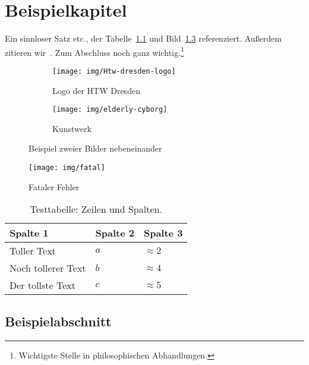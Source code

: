 
\chapter{Beispielkapitel}


Ein sinnloser Satz \gls{etc.}, der Tabelle~\ref{tab:testtable} und Bild~\ref{fig:testfig} referenziert.
Außerdem zitieren wir~\textcite{test16}.
Zum Abschluss noch ganz wichtig.\footnote{Wichtigste Stelle in philosophischen Abhandlungen.}


\begin{figure}[p]
    \centering
    \begin{subfigure}[b]{0.48\linewidth}
        \centering
        \texttt{[image: img/Htw-dresden-logo]}
        \caption{Logo der HTW Dresden}\label{fig:logo-htw}
    \end{subfigure}\enspace%
    \begin{subfigure}[b]{0.48\linewidth}
        \centering
        \texttt{[image: img/elderly-cyborg]}
        \caption{Kunstwerk}\label{fig:kunstwerk}
    \end{subfigure}
    \caption{Beispiel zweier Bilder nebeneinander}\label{fig:testfig}
\end{figure}

\begin{figure}[p]
    \centering
    \texttt{[image: img/fatal]}
    \caption{Fataler Fehler}\label{fig:fatal}
\end{figure}

\begin{table}[p]
    \centering
    \caption[Testtable]%
        {Testtabelle: Zeilen und Spalten.}
    \begin{tabular}{lll}
        \toprule
        Spalte 1 & Spalte 2 & Spalte 3 \\
        \midrule
        Toller Text  & $a$ & $\approx 2$ \\
        Noch tollerer Text & $b$ & $\approx 4$ \\
        Der tollste Text & $c$ & $\approx 5$ \\
        \bottomrule
    \end{tabular}\label{tab:testtable}
\end{table}

\section{Beispielabschnitt}

